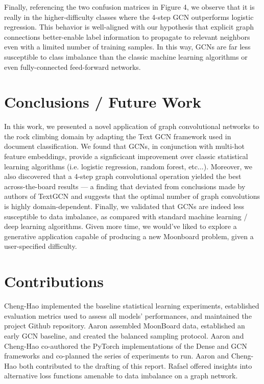 \documentclass{article}
\begin{document}
Finally, referencing the two confusion matrices in Figure 4, we observe that it is really in the higher-difficulty classes where the 4-step GCN outperforms logistic regression. This behavior is well-aligned with our hypothesis that explicit graph connections better-enable label information to propagate to relevant neighbors even with a limited number of training samples. In this way, GCNs are far less susceptible to class imbalance than the classic machine learning algorithms or even fully-connected feed-forward networks.

\section{Conclusions / Future Work}
In this work, we presented a novel application of graph convolutional networks to the rock climbing domain by adapting the Text GCN framework used in document classification. We found that GCNs, in conjunction with multi-hot feature embeddings, provide a signficicant improvement over classic statistical learning algorithms (i.e. logistic regression, random forest, etc...). Moreover, we also discovered that a 4-step graph convolutional operation yielded the best across-the-board results --- a finding that deviated from conclusions made by authors of TextGCN \cite{yao2018graph} and suggests that the optimal number of graph convolutions is highly domain-dependent. Finally, we validated that GCNs are indeed less susceptible to data imbalance, as compared with standard machine learning / deep learning algorithms. Given more time, we would've liked to explore a generative application \cite{mirza2014conditional} capable of producing a new Moonboard problem, given a user-specified difficulty.

\section{Contributions}
Cheng-Hao implemented the baseline statistical learning experiments, established evaluation metrics used to assess all models' performances, and maintained the project Github repository. Aaron assembled MoonBoard data, established an early GCN baseline, and created the balanced sampling protocol. Aaron and Cheng-Hao co-authored the PyTorch implementations of the Dense and GCN frameworks and co-planned the series of experiments to run. Aaron and Cheng-Hao both contributed to the drafting of this report. Rafael offered insights into alternative loss functions amenable to data imbalance on a graph network.



\end{document}
